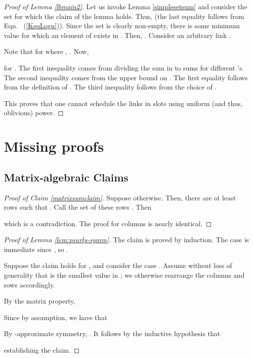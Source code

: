 \documentclass[11pt]{amsart}
\begin{document}
\begin{proof}[Proof of Lemma \ref{lbmain2}]
Let us invoke Lemma \ref{simplesetsum} and consider the set  for which the claim of the lemma holds. Thus,
 (the last equality follows from Eqn.~ (\ref{KeqLogn})). 
Since the set  is clearly non-empty, there is some minimum value  for which 
an element of  exists in . Then, . 
Consider an arbitrary link .

Note that for  where , .
Now,

for .
The first inequality comes from dividing the sum in to sums for different 's. The second inequality comes from
the upper bound on . The first equality follows from the definition of . The third inequality follows
from the choice of .

This proves that one cannot schedule the links in  slots using uniform (and thus, oblivious) power. 
\end{proof}










\appendix

\section{Missing proofs}

\subsection{Matrix-algebraic Claims}
\label{app:matrix}
\begin{proof}[Proof of Claim \ref{matrixsumclaim}]
Suppose otherwise. Then, there are at least  rows  such that . Call the set of these rows .
Then

which is a contradiction. The proof for columns is nearly identical.
\end{proof}

\begin{proof}[Proof of Lemma \ref{lem:nearly-symm}]
The claim is proved by induction.
The case  is immediate since , so .

Suppose the claim holds for , and consider the case .
Assume without loss of generality that  is the smallest value in
; we otherwise rearrange the columns and rows accordingly.

By the matrix property,

Since  by assumption, 
we have that 
\iffalse

The inequality  is implied by fact that 
\fi
By -approximate symmetry,
.
It follows by the inductive hypothesis that

establishing the claim.
\end{proof}
\end{document}

